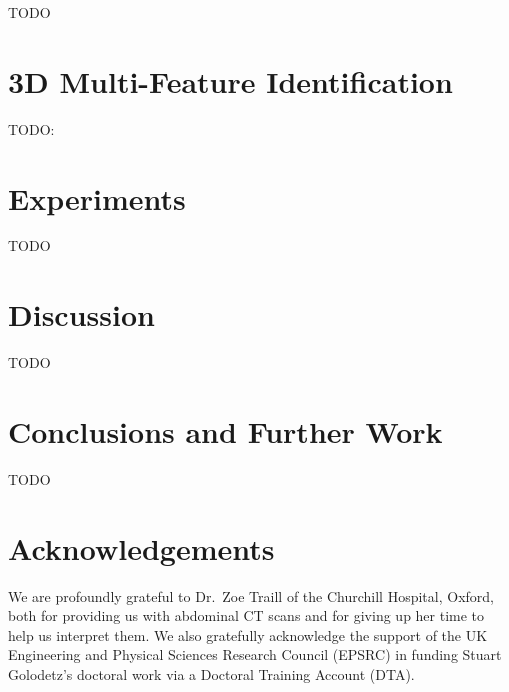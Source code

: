\documentclass[10pt,twocolumn,twoside]{IEEEtran}
\begin{document}
\IEEEpubidadjcol

TODO

\section{3D Multi-Feature Identification}
\label{sec:multi3d}

TODO: \cite{golodetz11}

\section{Experiments}
\label{sec:experiments}

TODO

\section{Discussion}
\label{sec:discussion}

TODO

\section{Conclusions and Further Work}
\label{sec:conclusions}

TODO

\section{Acknowledgements}

We are profoundly grateful to Dr.\ Zoe Traill of the Churchill Hospital, Oxford, both for providing us with abdominal CT scans and for giving up her time to help us interpret them. We also gratefully acknowledge the support of the UK Engineering and Physical Sciences Research Council (EPSRC) in funding Stuart Golodetz's doctoral work via a Doctoral Training Account (DTA).

\clearpage




\vspace{3cm}
\end{document}
